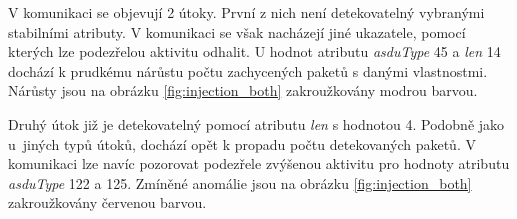 V komunikaci se objevují 2 útoky. První z nich není detekovatelný vybranými stabilními atributy. V komunikaci se však nacházejí jiné ukazatele, pomocí kterých lze podezřelou aktivitu odhalit. U hodnot atributu \emph{asduType} 45 a \emph{len} 14 dochází k prudkému nárůstu počtu zachycených paketů s danými vlastnostmi. Nárůsty jsou na obrázku \ref{fig:injection_both} zakroužkovány modrou barvou.

Druhý útok již je detekovatelný pomocí atributu \emph{len} s hodnotou 4. Podobně jako u~jiných typů útoků, dochází opět k propadu počtu detekovaných paketů. V komunikaci lze navíc pozorovat podezřele zvýšenou aktivitu pro hodnoty atributu \emph{asduType} 122 a 125. Zmíněné anomálie jsou na obrázku \ref{fig:injection_both} zakroužkovány červenou barvou.



